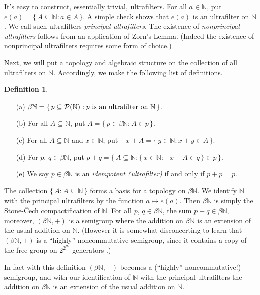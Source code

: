 \documentclass[12pt]{article}
\theoremstyle{plain}
\theoremstyle{definition}
\newtheorem{defn}[thm]{Definition}
\newcommand{\bbN}{\mathbb{N}}
\begin{document}
It's easy to construct, essentially trivial, ultrafilters. 
For all $a \in \bbN$, put $e(a) = \{\, A \subseteq \bbN : a \in A
\,\}$.
A simple check shows that $e(a)$ is an ultrafilter on
$\bbN$. 
We call such ultrafilters \textsl{principal ultrafilters}. 
The existence of \textsl{nonprincipal ultrafilters} follows from an
application of Zorn's Lemma. 
(Indeed the existence of nonprincipal ultrafilters requires some form
of choice.)

Next, we will put a topology and algebraic structure on the collection
of all ultrafilters on $\bbN$. 
Accordingly, we make the following list of definitions.

  \begin{defn}
    \label{defn:alg}
    \begin{itemize}
      \item[(a)] $\beta\bbN = \{\, p \subseteq \mathcal{P}(\bbN) :
        \hbox{$p$ is an ultrafilter on
        $\bbN$} \,\}$.
      \item[(b)] For all $A \subseteq \bbN$, put $\overline{A} = \{\,
        p \in \beta\bbN : A \in p \,\}$.
      \item[(c)] For all $A \subseteq \bbN$ and $x \in \bbN$, put
        $-x+A = \{\, y \in \bbN : x+y \in A \,\}$.
      \item[(d)] For $p$, $q \in \beta\bbN$, put
        $p+q = \bigl\{\, A \subseteq \bbN : \{\, x \in \bbN : -x +A \in q
        \,\} \in p \,\bigr\}$.
      \item[(e)] We say $p \in \beta\bbN$ is an \textsl{idempotent
          (ultrafilter)} if  and only if $p + p = p$.
    \end{itemize}
  \end{defn}

The collection $\{\, \overline{A} : A \subseteq \bbN \,\}$ forms a
basis for a topology on $\beta\bbN$.
We identify $\bbN$ with the principal ultrafilters by the function
$a \mapsto e(a)$. Then $\beta\bbN$ is simply the Stone-\v{C}ech
compactification of $\bbN$. 
For all $p$, $q \in \beta\bbN$, the sum $p+q \in \beta\bbN$, moreover,
$(\beta\bbN, +)$ is a semigroup where the addition on $\beta\bbN$ is
an extension of the usual addition on $\bbN$. 
(However it is somewhat disconcerting to learn that $(\beta\bbN, +)$
is a ``highly'' noncommutative semigroup, since it contains a copy of
the free group on $2^{2^{\aleph_0}}$ generators \cite[Corollary
7.36]{Hindman:1998fk}.)

In fact with this definition $(\beta\bbN, +)$ becomes a (``highly''
noncommutative!) semigroup, and with our identification of $\bbN$ with
the principal ultrafilters the addition on $\beta\bbN$ is an extension
of the usual addition on $\bbN$. 
\end{document}
